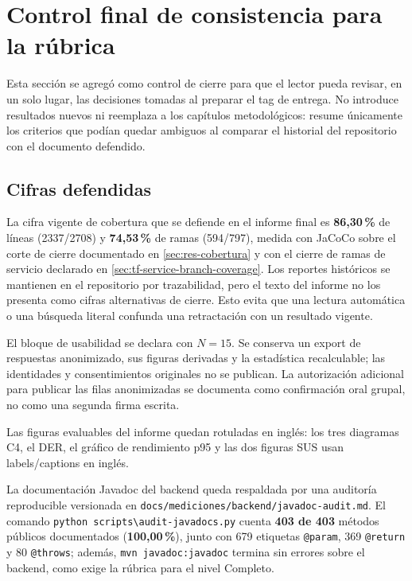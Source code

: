 \clearpage
\section{Control final de consistencia para la rúbrica}
\label{sec:anexo-control-rubrica}

Esta sección se agregó como control de cierre para que el lector pueda
revisar, en un solo lugar, las decisiones tomadas al preparar el tag de
entrega. No introduce resultados nuevos ni reemplaza a los capítulos
metodológicos: resume únicamente los criterios que podían quedar
ambiguos al comparar el historial del repositorio con el documento
defendido.

\subsection*{Cifras defendidas}

La cifra vigente de cobertura que se defiende en el informe final es
\textbf{86,30\,\%} de líneas (2337/2708) y \textbf{74,53\,\%} de ramas
(594/797), medida con JaCoCo sobre el corte de cierre
documentado en \autoref{sec:res-cobertura} y con el cierre de ramas de
servicio declarado en \autoref{sec:tf-service-branch-coverage}. Los reportes históricos se
mantienen en el repositorio por trazabilidad, pero el texto del informe
no los presenta como cifras alternativas de cierre. Esto evita que una
lectura automática o una búsqueda literal confunda una retractación con
un resultado vigente.

El bloque de usabilidad se declara con \textbf{$N=15$}. Se conserva un
export de respuestas anonimizado, sus figuras derivadas y la estadística
recalculable; las identidades y consentimientos originales no se publican.
La autorización adicional para publicar las filas anonimizadas se documenta
como confirmación oral grupal, no como una segunda firma escrita.

Las figuras evaluables del informe quedan rotuladas en inglés: los tres
diagramas C4, el DER, el gráfico de rendimiento p95 y las dos figuras SUS
usan labels/captions en inglés.

La documentación Javadoc del backend queda respaldada por una auditoría
reproducible versionada en
\texttt{docs/mediciones/backend/javadoc-audit.md}. El comando
\texttt{python scripts\textbackslash audit-javadocs.py} cuenta
\textbf{403 de 403} métodos públicos documentados
(\textbf{100,00\,\%}), junto con 679 etiquetas \texttt{@param}, 369
\texttt{@return} y 80 \texttt{@throws}; además,
\texttt{mvn javadoc:javadoc} termina sin errores sobre el backend, como
exige la rúbrica para el nivel Completo.

